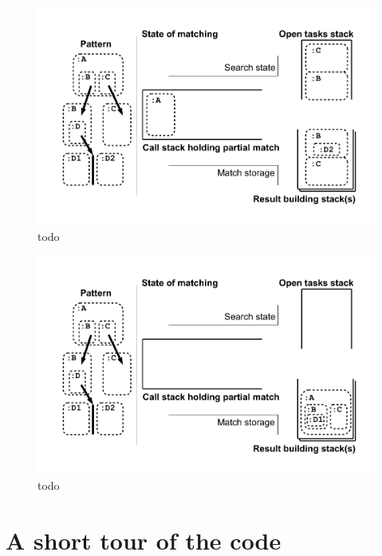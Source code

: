 \begin{figure}[htbp]
  \centering
  \includegraphics[width=\textwidth]{fig/Passungszustand11}
  \caption{todo}
  \label{figmatchingstate11}
\end{figure}

\begin{figure}[htbp]
  \centering
  \includegraphics[width=\textwidth]{fig/Passungszustand12}
  \caption{todo}
  \label{figmatchingstate12}
\end{figure}


\section{A short tour of the code}

